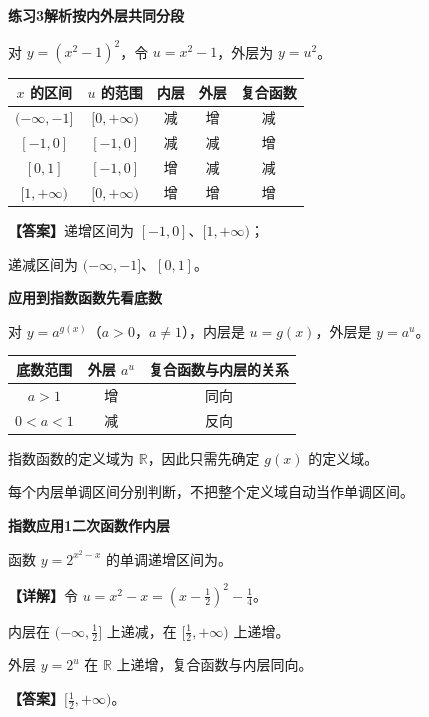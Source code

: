 \documentclass[UTF8,10pt,aspectratio=169]{ctexbeamer}
\newcommand{\PageHeading}[1]{\begin{center}{\Large\bfseries #1}\end{center}\vspace{0.2cm}}
\newcommand{\Answer}[1]{\par\vspace{0.2cm}\textbf{【答案】}#1}
\newcommand{\Analysis}[1]{\par\vspace{0.2cm}\textbf{【详解】}#1}
\begin{document}
\begin{frame}[t,label=F15]
  \PageHeading{练习3解析\quad 按内外层共同分段}
  对 $y=(x^2-1)^2$，令 $u=x^2-1$，外层为 $y=u^2$。
  \pause
  \begin{center}
  \renewcommand{\arraystretch}{1.6}
  \begin{tabular}{c|c|c|c|c}
    $x$ 的区间 & $u$ 的范围 & 内层 & 外层 & 复合函数\\\hline
    $(-\infty,-1]$ & $[0,+\infty)$ & 减 & 增 & 减\\
    $[-1,0]$ & $[-1,0]$ & 减 & 减 & 增\\
    $[0,1]$ & $[-1,0]$ & 增 & 减 & 减\\
    $[1,+\infty)$ & $[0,+\infty)$ & 增 & 增 & 增
  \end{tabular}
  \end{center}
  \Answer{递增区间为 $[-1,0]$、$[1,+\infty)$；\par
  递减区间为 $(-\infty,-1]$、$[0,1]$。}
\end{frame}

\begin{frame}[t,label=F16]
  \PageHeading{应用到指数函数\quad 先看底数}
  对 $y=a^{g(x)}$（$a>0$，$a\ne1$），内层是 $u=g(x)$，外层是 $y=a^u$。
  \begin{center}
  \renewcommand{\arraystretch}{1.7}
  \begin{tabular}{c|c|c}
    底数范围 & 外层 $a^u$ & 复合函数与内层的关系\\\hline
    $a>1$ & 增 & 同向\\
    $0<a<1$ & 减 & 反向
  \end{tabular}
  \end{center}
  \pause
  指数函数的定义域为 $\mathbb R$，因此只需先确定 $g(x)$ 的定义域。
  \par 每个内层单调区间分别判断，不把整个定义域自动当作单调区间。
\end{frame}

\begin{frame}[t,label=F17]
  \PageHeading{指数应用1\quad 二次函数作内层}
  函数 $y=2^{x^2-x}$ 的单调递增区间为\underline{\hspace{2.3cm}}。
  \pause
  \Analysis{令 $u=x^2-x=(x-\frac12)^2-\frac14$。
  \par 内层在 $(-\infty,\frac12]$ 上递减，在 $[\frac12,+\infty)$ 上递增。
  \par 外层 $y=2^u$ 在 $\mathbb R$ 上递增，复合函数与内层同向。}
  \Answer{$\displaystyle[\tfrac12,+\infty)$。}
\end{frame}
\end{document}
